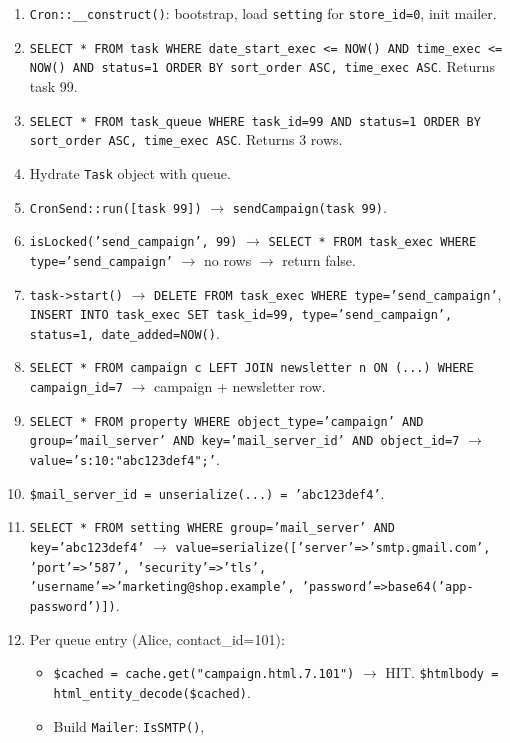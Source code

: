 \documentclass[11pt,a4paper]{article}
\begin{document}
\begin{enumerate}[leftmargin=1.6em,itemsep=2pt]
  \item \texttt{Cron::\_\_construct()}: bootstrap, load
        \texttt{setting} for \texttt{store\_id=0}, init mailer.
  \item \texttt{SELECT * FROM task WHERE date\_start\_exec <= NOW()
        AND time\_exec <= NOW() AND status=1 ORDER BY sort\_order
        ASC, time\_exec ASC}. Returns task 99.
  \item \texttt{SELECT * FROM task\_queue WHERE task\_id=99 AND
        status=1 ORDER BY sort\_order ASC, time\_exec ASC}.
        Returns 3 rows.
  \item Hydrate \texttt{Task} object with queue.
  \item \texttt{CronSend::run([task 99])} $\to$
        \texttt{sendCampaign(task 99)}.
  \item \texttt{isLocked('send\_campaign', 99)} $\to$
        \texttt{SELECT * FROM task\_exec WHERE
        type='send\_campaign'} $\to$ no rows $\to$ return false.
  \item \texttt{task->start()} $\to$ \texttt{DELETE FROM
        task\_exec WHERE type='send\_campaign'},
        \texttt{INSERT INTO task\_exec SET task\_id=99,
        type='send\_campaign', status=1, date\_added=NOW()}.
  \item \texttt{SELECT * FROM campaign c LEFT JOIN newsletter n
        ON (...) WHERE campaign\_id=7} $\to$ campaign + newsletter
        row.
  \item \texttt{SELECT * FROM property WHERE
        object\_type='campaign' AND group='mail\_server' AND
        key='mail\_server\_id' AND object\_id=7} $\to$
        \texttt{value='s:10:"abc123def4";'}.
  \item \texttt{\$mail\_server\_id = unserialize(...) = 'abc123def4'}.
  \item \texttt{SELECT * FROM setting WHERE group='mail\_server'
        AND key='abc123def4'} $\to$
        \texttt{value=serialize(['server'=>'smtp.gmail.com',
        'port'=>'587', 'security'=>'tls',
        'username'=>'marketing@shop.example',
        'password'=>base64('app-password')])}.
  \item Per queue entry (Alice, contact\_id=101):
        \begin{itemize}[itemsep=2pt]
          \item \texttt{\$cached = cache.get("campaign.html.7.101")}
                $\to$ HIT. \texttt{\$htmlbody =
                html\_entity\_decode(\$cached)}.
          \item Build \texttt{Mailer}: \texttt{IsSMTP()},

\end{itemize}
\end{enumerate}
\end{document}
